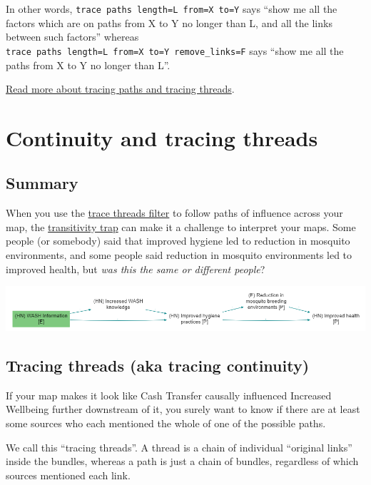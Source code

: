 \documentclass[
]{book}
\begin{document}
In other words, \texttt{trace\ paths\ length=L\ from=X\ to=Y} says ``show me all the factors which are on paths from X to Y no longer than L, and all the links between such factors'' whereas \texttt{trace\ paths\ length=L\ from=X\ to=Y\ remove\_links=F} says ``show me all the paths from X to Y no longer than L''.

\protect\hyperlink{xcontinuity}{Read more about tracing paths and tracing threads}.

\hypertarget{xcontinuity}{%
\chapter{Continuity and tracing threads}\label{xcontinuity}}

\hypertarget{summary-7}{%
\section{Summary}\label{summary-7}}

When you use the \protect\hyperlink{xtracing-paths}{trace threads filter} to follow paths of influence across your map, the \protect\hyperlink{xtransitivity-trap}{transitivity trap} can make it a challenge to interpret your maps. Some people (or somebody) said that improved hygiene led to reduction in mosquito environments, and some people said reduction in mosquito environments led to improved health, but \emph{was this the same or different people}?

\includegraphics{_assets/image-20211215081735743.png}

\hypertarget{xtracing-threads}{%
\section{Tracing threads (aka tracing continuity)}\label{xtracing-threads}}

If your map makes it look like Cash Transfer causally influenced Increased Wellbeing further downstream of it, you surely want to know if there are at least some sources who each mentioned the whole of one of the possible paths.

We call this ``tracing threads''. A thread is a chain of individual ``original links'' inside the bundles, whereas a path is just a chain of bundles, regardless of which sources mentioned each link.
\end{document}
